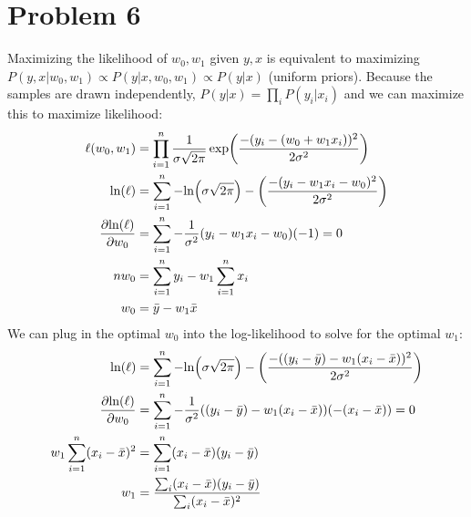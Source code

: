 \documentclass[11pt]{article}
\let\origleft\left
\let\origright\right
\renewcommand{\left}{\mathopen{}\mathclose\bgroup\origleft}
\renewcommand{\right}{\aftergroup\egroup\origright}
\newcommand{\p}[1]{\left(#1\right)}
\renewcommand{\ln}[1]{\text{ln}\p{#1}}
\begin{document}
\newpage
\section*{Problem 6}
Maximizing the likelihood of $w_0,w_1$ given $y,x$ is equivalent to maximizing $P(y,x|w_0,w_1)\propto P(y|x,w_0,w_1)\propto P(y|x)$ (uniform priors). Because the samples are drawn independently, $P(y|x)=\prod_i P(y_i|x_i)$ and we can maximize this to maximize likelihood:
\begin{align*}
\ell(w_0,w_1) &= \prod_{i=1}^n\frac1{\sigma\sqrt{2\pi}}\exp\left(\frac{-(y_i-(w_0+w_1x_i))^2}{2\sigma^2}\right)\\
\ln{\ell} &= \sum_{i=1}^n-\ln{\sigma\sqrt{2\pi}}-\left(\frac{-(y_i-w_1x_i-w_0)^2}{2\sigma^2}\right)\\
\frac{\partial\ln{\ell}}{\partial w_0} &= \sum_{i=1}^n-\frac1{\sigma^2}(y_i-w_1x_i-w_0)(-1) = 0\\
nw_0 &= \sum_{i=1}^ny_i-w_1\sum_{i=1}^nx_i\\
w_0 &= \bar{y}-w_1\bar{x}
\end{align*}
We can plug in the optimal $w_0$ into the log-likelihood to solve for the optimal $w_1$:
\begin{align*}
\ln{\ell} &= \sum_{i=1}^n-\ln{\sigma\sqrt{2\pi}}-\left(\frac{-((y_i-\bar{y})-w_1(x_i-\bar{x}))^2}{2\sigma^2}\right)\\
\frac{\partial\ln{\ell}}{\partial w_0} &= \sum_{i=1}^n-\frac1{\sigma^2}((y_i-\bar{y})-w_1(x_i-\bar{x}))(-(x_i-\bar{x})) = 0\\
w_1\sum_{i=1}^n(x_i-\bar{x})^2 &= \sum_{i=1}^n(x_i-\bar{x})(y_i-\bar{y})\\
w_1 &= \frac{\sum_i(x_i-\bar{x})(y_i-\bar{y})}{\sum_i(x_i-\bar{x})^2}
\end{align*}


\newpage
\end{document}
